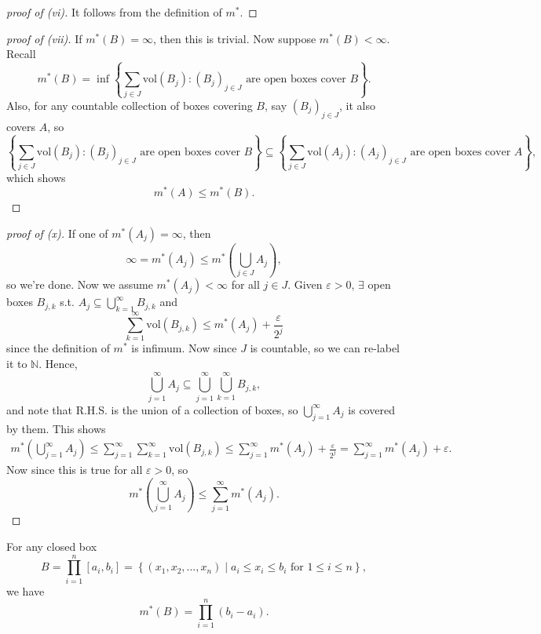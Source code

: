 \begin{proof}[proof of (vi)]
    It follows from the definition of \(m^*\). 
\end{proof}

\begin{proof}[proof of (vii)]
    If \(m^* (B) = \infty \), then this is trivial. Now suppose \(m^* (B) < \infty \). Recall 
    \[
        m^* (B) = \inf \left\{ \sum_{j \in J} \mathrm{vol} (B_j) : (B_j)_{j \in J} \text{ are open boxes cover } B    \right\}. 
    \]  
    Also, for any countable collection of boxes covering \(B\), say \((B_j)_{j \in J}\), it also covers \(A\), so
    \[
       \left\{ \sum_{j \in J} \mathrm{vol} (B_j) : (B_j)_{j \in J} \text{ are open boxes cover } B    \right\} \subseteq \left\{ \sum_{j \in J} \mathrm{vol} (A_j) : (A_j)_{j \in J} \text{ are open boxes cover } A    \right\},
    \] 
    which shows
    \[
        m^* (A) \le m^*(B).
    \]  
\end{proof}

\begin{proof}[proof of (x)]
    If one of \(m^* (A_j) = \infty \), then 
    \[
        \infty = m^* (A_j) \le m^* \left( \bigcup_{j \in J} A_j  \right), 
    \] 
    so we're done. Now we assume \(m^* (A_j) < \infty \) for all \(j \in J\). Given \(\varepsilon > 0\), \(\exists \) open boxes \(B_{j, k}\) s.t. \(A_j \subseteq \bigcup_{k=1}^{\infty} B_{j, k} \) and 
    \[
        \sum_{k=1}^{\infty} \mathrm{vol} (B_{j, k}) \le m^* (A_j) + \frac{\varepsilon}{2^j}
    \]
    since the definition of \(m^*\) is infimum. Now since \(J\) is countable, so we can re-label it to \(\mathbb{N}\). Hence, 
    \[
        \bigcup_{j=1}^{\infty} A_j \subseteq \bigcup_{j=1}^{\infty} \bigcup_{k=1}^{\infty} B_{j, k},   
    \]       
    and note that R.H.S. is the union of a collection of boxes, so \(\bigcup_{j=1}^{\infty} A_j \) is covered by them.  
    This shows 
    \begin{align*}
        m^* \left( \bigcup_{j=1}^{\infty} A_j  \right) \le \sum_{j=1}^{\infty} \sum_{k=1}^{\infty} \mathrm{vol} (B_{j, k}) \le \sum_{j=1}^{\infty} m^* (A_j) + \frac{\varepsilon}{2^j} = \sum_{j=1}^{\infty} m^* (A_j) + \varepsilon.     
    \end{align*}
    Now since this is true for all \(\varepsilon > 0\), so 
    \[
        m^* \left( \bigcup_{j=1}^{\infty} A_j  \right) \le \sum_{j=1}^{\infty} m^*(A_j).  
    \] 
\end{proof}

\begin{proposition}
    For any closed box
    \[
        B = \prod _{i=1}^n [a_i, b_i] = \left\{ (x_1, x_2, \dots , x_n) \mid a_i \le x_i \le b_i \text{ for } 1 \le i \le n  \right\},
    \]
    we have
    \[
        m^* (B) = \prod _{i=1}^n (b_i - a_i).
    \]
\end{proposition}

